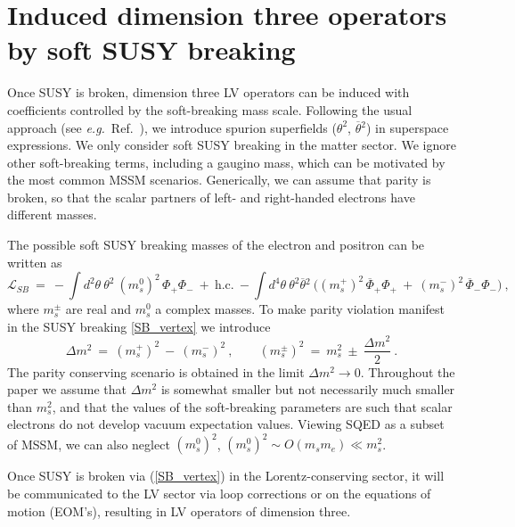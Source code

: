 \documentclass[12pt]{revtex4}
\begin{document}
\section{Induced dimension three operators by soft SUSY breaking}
\label{InducedDim3}


Once SUSY is broken, dimension three LV operators can be induced 
with coefficients controlled by the soft-breaking mass scale. 
Following the usual approach (see {\em e.g.}\ Ref.~\cite{Wess:1992cp}),
we introduce spurion superfields ($\theta^2$, $\overline\theta{}^2$) in
superspace expressions. We only consider soft SUSY breaking in the
matter sector. We ignore other soft-breaking terms, including a
gaugino mass, which can be motivated by the most common MSSM scenarios.
Generically, we can assume that parity is broken, so that
the scalar partners of left- and right-handed electrons have different masses.


The possible soft SUSY breaking masses of the electron and positron
can be written as 
\begin{equation}
\label{SB_vertex}
  \mathcal{L}_{SB} ~=~  
- \int d^2\theta ~ \theta^2~ 
(m_{s}^0)^2 \, \Phi_+ \Phi_-
~+~ \text{h.c.} 
~- \int d^4\theta ~
\theta^2\overline{\theta}{}^2~ 
\Big( 
(m_s^+)^2\, \overline{\Phi}_+ \Phi_+ 
~+~
(m_s^-)^2\, \overline{\Phi}_- \Phi_-
\Big)  
~, 
\end{equation}
%
where $m_s^\pm$ are real and $m_s^{0}$ a complex masses. 
To make parity violation manifest in the SUSY breaking 
\eqref{SB_vertex} we introduce 
\begin{equation}
\Delta m^2 ~=~ (m_{s}^+)^2 ~ - ~ (m_{s}^-)^2~, 
\qquad
(m_{s}^\pm)^2 ~=~ m_s^2 ~\pm~ \frac{\Delta m^2}2~.
\label{deltam}
\end{equation}
%
The parity conserving scenario is obtained in the limit 
$ \Delta m^2 \to 0 $. Throughout the paper we assume that 
 $ \Delta m^2$ is somewhat smaller but not necessarily much smaller than 
$m_s^2$, and that the values of the soft-breaking parameters are such that 
scalar electrons do not develop vacuum expectation values. 
Viewing SQED as a subset of MSSM, we can also neglect $(m_{s}^0)^2$, $(m_{s}^0)^2
\sim O(m_s m_e)\ll m_s^2$. 

Once SUSY
is broken via (\ref{SB_vertex}) in the Lorentz-conserving sector, it
will be communicated to the LV sector via loop corrections or on the
equations of motion (EOM's), resulting in LV operators of dimension three.  
\end{document}
